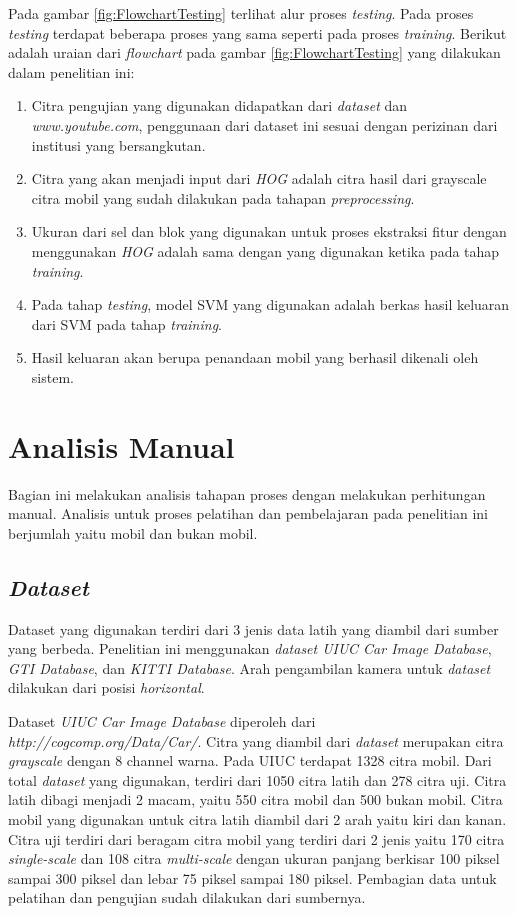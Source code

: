 \noindent Pada gambar \ref{fig:FlowchartTesting} terlihat alur proses \textit{testing}. Pada proses \textit{testing} terdapat beberapa proses yang sama seperti pada proses \textit{training}. Berikut adalah uraian dari \textit{flowchart} pada gambar \ref{fig:FlowchartTesting} yang dilakukan dalam penelitian ini:
\begin{enumerate}
\item Citra pengujian yang digunakan didapatkan dari \textit{dataset} dan \textit{www.youtube.com}, penggunaan dari dataset ini sesuai dengan perizinan dari institusi yang bersangkutan.
\item Citra yang akan menjadi input dari \textit{HOG} adalah citra hasil dari grayscale citra mobil yang sudah dilakukan pada tahapan \textit{preprocessing}.
\item Ukuran dari sel dan blok yang digunakan untuk proses ekstraksi fitur dengan menggunakan \textit{HOG} adalah sama dengan yang digunakan ketika pada tahap \textit{training}.
\item Pada tahap \textit{testing}, model SVM yang digunakan adalah berkas hasil keluaran dari SVM pada tahap \textit{training}.
\item Hasil keluaran akan berupa penandaan mobil yang berhasil dikenali oleh sistem.\\
\end{enumerate}

\section{Analisis Manual}
Bagian ini melakukan analisis tahapan proses dengan melakukan perhitungan manual. Analisis untuk proses pelatihan dan pembelajaran pada penelitian ini berjumlah yaitu mobil dan bukan mobil.\\

\subsection{\textit{Dataset}}
Dataset yang digunakan terdiri dari 3 jenis data latih yang diambil dari sumber yang berbeda. Penelitian ini menggunakan \textit{dataset UIUC Car Image Database}, \textit{GTI Database}, dan \textit{KITTI Database}. Arah pengambilan kamera untuk \textit{dataset} dilakukan dari posisi \textit{horizontal}.

Dataset \textit{UIUC Car Image Database} diperoleh dari \textit{http://cogcomp.org/Data/Car/}. Citra yang diambil dari \textit{dataset} merupakan citra \textit{grayscale} dengan 8 channel warna. Pada UIUC terdapat 1328 citra mobil. Dari total \textit{dataset} yang digunakan, terdiri dari 1050 citra latih dan 278 citra uji. Citra latih dibagi menjadi 2 macam, yaitu 550 citra mobil dan 500 bukan mobil. Citra mobil yang digunakan untuk citra latih diambil dari 2 arah yaitu kiri dan kanan. Citra uji terdiri dari beragam citra mobil yang terdiri dari 2 jenis yaitu 170 citra \textit{single-scale} dan 108 citra \textit{multi-scale} dengan ukuran panjang berkisar 100 piksel sampai 300 piksel dan lebar 75 piksel sampai 180 piksel. Pembagian data untuk pelatihan dan pengujian sudah dilakukan dari sumbernya. 

